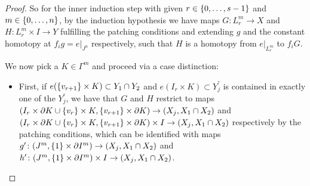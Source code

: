 \begin{prop}
\begin{proof}
        So for the inner induction step with given $r\in\left\lbrace0,\ldots,s-1\right\rbrace$ and $m\in\left\lbrace0,\ldots,n\right\rbrace$, by the induction hypothesis we have maps $G\colon L_r^m\to X$ and $H\colon L_r^m\times I\to Y$ fulfilling the patching conditions and extending $g$ and the constant homotopy at $f_ig=e|_{J^n}$ respectively, such that $H$ is a homotopy from $e|_{L_r^m}$ to $f_iG$.

        We now pick a $K\in\Gamma^m$ and proceed via a case distinction:
        \begin{itemize}
            \item First, if $e(\left\lbrace v_{r+1}\right\rbrace\times K)\subset Y_1\cap Y_2$ and $e(I_r\times K)\subset Y_j^°$ is contained in exactly one of the $Y_j^°$, we have that $G$ and $H$ restrict to maps $(I_r\times\partial K\cup\left\lbrace v_r\right\rbrace\times K, \left\lbrace v_{r+1}\right\rbrace\times\partial K)\to(X_j,X_1\cap X_2)$ and $(I_r\times\partial K\cup\left\lbrace v_r\right\rbrace\times K, \left\lbrace v_{r+1}\right\rbrace\times\partial K)\times I\to(X_j,X_1\cap X_2)$ respectively by the patching conditions, which can be identified with maps $g'\colon(J^m, \left\lbrace1\right\rbrace\times\partial{I^m})\to(X_j,X_1\cap X_2)$ and $h'\colon (J^m, \left\lbrace1\right\rbrace\times\partial{I^m})\times I\to(X_j,X_1\cap X_2)$.
        

\end{itemize}
\end{proof}
\end{prop}
